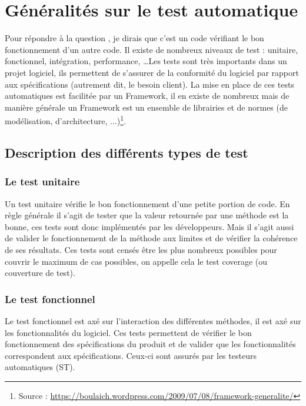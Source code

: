 
\section{G\'{e}n\'{e}ralit\'{e}s sur le test automatique}

Pour r\'{e}pondre \`{a} la question , je dirais que c'est un code v\'{e}rifiant le bon fonctionnement d'un autre code. Il existe de nombreux niveaux de test : unitaire, fonctionnel, int\'{e}gration, performance, \ldots Les tests sont tr\`{e}s importants dans un projet logiciel, ils permettent de s'assurer de la conformit\'{e} du logiciel par rapport aux sp\'{e}cifications (autrement dit, le besoin client). La mise en place de ces tests automatiques est facilit\'{e}e par un Framework, il en existe de nombreux mais de mani\`{e}re g\'{e}n\'{e}rale un Framework est un ensemble de librairies et de normes (de mod\'{e}lisation, d'architecture, ...)\footnote{Source : \url{https://boulaich.wordpress.com/2009/07/08/framework-generalite/}}. \\
\subsection{Description des diff\'{e}rents types de test}



\subsubsection{Le test unitaire}
Un test unitaire v\'{e}rifie le bon fonctionnement d'une petite portion de code. En r\`{e}gle g\'{e}n\'{e}rale il s'agit de tester que la valeur retourn\'{e}e par une m\'{e}thode est la bonne, ces tests sont donc impl\'{e}ment\'{e}s par les d\'{e}veloppeurs. Mais il s'agit aussi de valider le fonctionnement de la m\'{e}thode aux limites et de v\'{e}rifier la coh\'{e}rence de ses r\'{e}sultats. Ces tests sont cens\'{e}s \^{e}tre les plus nombreux possibles pour couvrir le maximum de cas possibles, on appelle cela le test coverage (ou couverture de test).

\subsubsection{Le test fonctionnel}
Le test fonctionnel est ax\'{e} sur l'interaction des diff\'{e}rentes m\'{e}thodes, il est ax\'{e} sur les fonctionnalit\'{e}s du logiciel. Ces tests permettent de v\'{e}rifier le bon fonctionnement des sp\'{e}cifications du produit et de valider que les fonctionnalit\'{e}s correspondent aux sp\'{e}cifications. Ceux-ci sont assur\'{e}s par les testeurs automatiques (ST).

